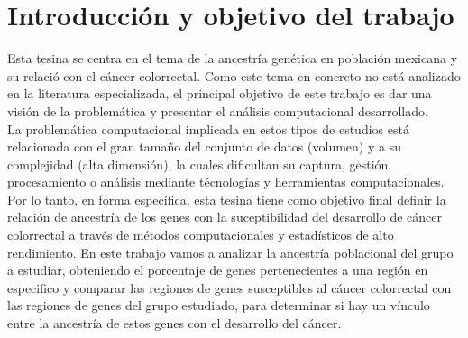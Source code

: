 



\chapter{Introducci\'on y objetivo del trabajo}



Esta tesina se centra en el tema de la ancestría genética en población mexicana y su relaci\'o con el cáncer colorrectal. Como este tema en concreto no está analizado en la literatura especializada, el principal objetivo de este trabajo es dar una visión de la problemática y presentar el análisis computacional desarrollado. \\

La problem\'atica computacional implicada en estos tipos de estudios est\'a relacionada con el gran tamaño del conjunto de datos (volumen) y a su complejidad (alta dimensi\'on), la cuales dificultan su captura, gestión, procesamiento o análisis mediante técnologías y herramientas computacionales. Por lo tanto, en forma específica, esta tesina tiene como objetivo final definir la relación de ancestría de los genes con la suceptibilidad del desarrollo de cáncer colorrectal a través de métodos computacionales y estadísticos de alto rendimiento. En este trabajo vamos a analizar la ancestría poblacional del grupo a estudiar, obteniendo el porcentaje de genes pertenecientes a una región en especifico y comparar las regiones de genes susceptibles al cáncer colorrectal con las regiones de genes del grupo estudiado, para determinar si hay un vínculo entre la ancestría de estos genes con el desarrollo del cáncer.\\


